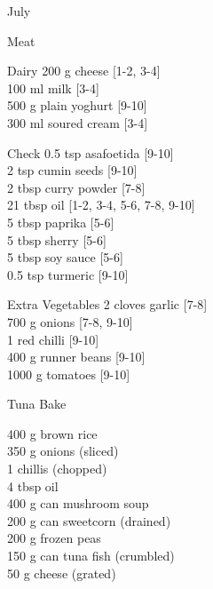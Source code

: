 \begin{menu}{July}
\begin{shoppinglist}{Meat}
      \end{shoppinglist}%
      \begin{shoppinglist}{Dairy}
      200 g cheese 
        {\scriptsize[1-2, 3-4]}\\
      100 ml milk 
        {\scriptsize[3-4]}\\
      500 g plain yoghurt 
        {\scriptsize[9-10]}\\
      300 ml soured cream 
        {\scriptsize[3-4]}\\
      \end{shoppinglist}%
      \par\vfil %
      \vfil\clearpage %
      \begin{shoppinglist}{Check}
      0.5 tsp asafoetida 
        {\scriptsize[9-10]}\\
      2 tsp cumin seeds 
        {\scriptsize[9-10]}\\
      2 tbsp curry powder 
        {\scriptsize[7-8]}\\
      21 tbsp oil 
        {\scriptsize[1-2, 3-4, 5-6, 7-8, 9-10]}\\
      5 tbsp paprika 
        {\scriptsize[5-6]}\\
      5 tbsp sherry 
        {\scriptsize[5-6]}\\
      5 tbsp soy sauce 
        {\scriptsize[5-6]}\\
      0.5 tsp turmeric 
        {\scriptsize[9-10]}\\
      \end{shoppinglist}%
      \begin{shoppinglist}{Extra Vegetables}
      2 cloves garlic 
        {\scriptsize[7-8]}\\
      700 g onions 
        {\scriptsize[7-8, 9-10]}\\
      1  red chilli 
        {\scriptsize[9-10]}\\
      400 g runner beans 
        {\scriptsize[9-10]}\\
      1000 g tomatoes 
        {\scriptsize[9-10]}\\
      \end{shoppinglist}%
      \par\vfil %
    \vfil\clearpage
  
    \begin{recipe}{2}{Tuna Bake}%
		\begin{ingredients}
		400 g brown rice  \\
	350 g onions (sliced) \\
	1  chillis (chopped) \\
	4 tbsp oil  \\
	400 g can mushroom soup  \\
	200 g can sweetcorn (drained) \\
	200 g frozen peas  \\
	150 g can tuna fish (crumbled) \\
	50 g cheese (grated) \\
	

\end{ingredients}
\end{recipe}
\end{menu}
